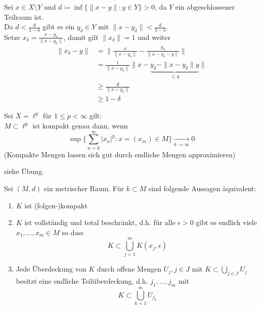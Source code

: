 \begin{beweis}
	Sei $x \in X \setminus Y$ und $d \coloneqq \inf \{ \| x - y \|: y \in Y \} > 0$, da $Y$ ein abgeschlossener Teilraum ist. \\
	Da $ d < \frac{d}{1 - \delta}$ gibt es ein $y_{\delta} \in Y$ mit $\| x - y_{\delta} \| < \frac{d}{1 -  \delta}$. \\ 
	Setze $x_{\delta} = \frac{x - y_{\delta}}{\| x - y_{\delta} \|}$, damit gilt $\| x_{\delta} \| = 1$ und weiter 
	\begin{align*}
		\| x_{\delta} - y \| & = \| \frac{x}{\| x - y_{\delta} \|} - \frac{y_\delta}{\| x - y_{\delta} - y\|} \|	\\
			& = \frac{1}{\| x - y_{\delta} \|} \| x - \underbrace{y_{\delta} - \| x - y_{\delta} \| y}_{\leq y} \| \\
			& \geq \frac{d}{\| x - y_{\delta} \|} \\
			& \geq 1 - \delta
	\end{align*}
\end{beweis}


\begin{beispiel} \label{bsp:6.4}
	Sei $X = \ell^{p}$ für $1 \leq p < \infty$ gilt: \\
	$M \subset \ell^{p}$ ist kompakt genau dann, wenn
	\[ \sup \{ \sum_{n = k}^{\infty} |x_{n}|^{p} : x = (x_{m}) \in M \} \xrightarrow[k \rightarrow \infty]{} 0 \]	
	(Kompakte Mengen lassen sich gut durch endliche Mengen approximieren)
\end{beispiel}

\begin{beweis}
	siehe Übung.	
\end{beweis}


\begin{satz} \label{satz:6.5}
	Sei $(M, d)$ ein metrischer Raum. Für $k \subset M$ sind folgende Aussagen äquivalent:
	\begin{enumerate}[label=\alph*\upshape)]
		\label{satz:6.5a}
		\item $K$ ist (folgen-)kompakt 
		\label{satz:6.5b}
		\item $K$ ist vollständig und total beschränkt, d.h. für alle $\epsilon > 0$ gibt es endlich viele $x_{1}, \dotsc, x_{m} \in M$ so dass
			\[ K \subset \bigcup_{j = 1}^{m} K(x_{j}, \epsilon) \]
		\label{satz:6.5c}
		\item Jede Überdeckung von $K$ durch offene Mengen $U_{j}, j \in J$ mit $K \subset \bigcup_{j \in J} U_{j}$ besitzt eine endliche Teilüberdeckung, d.h. $j_{1}, \dotsc, j_{m}$ mit
			\[ K \subset \bigcup_{k = 1}^{m} U_{j_{k}} \]
	\end{enumerate}
\end{satz}

